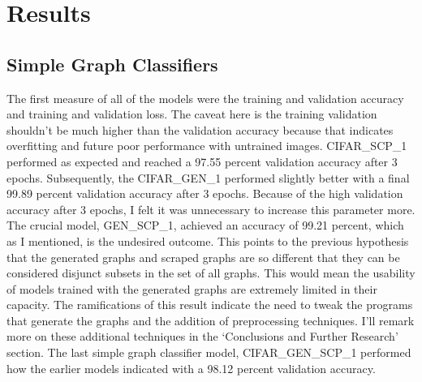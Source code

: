 \documentclass[12pt]{article}
\begin{document}
    \section{Results}
    
        \subsection{Simple Graph Classifiers}

            The first measure of all of the models were the training and validation accuracy and training and validation loss. 
            The caveat here is the training validation shouldn’t be much higher than the validation accuracy 
            because that indicates overfitting and future poor performance with untrained images. 
            CIFAR\_SCP\_1 performed as expected and reached a 97.55 percent validation accuracy after 3 epochs. 
            Subsequently, the CIFAR\_GEN\_1 performed slightly better with a final 99.89 percent validation accuracy after 3 epochs. 
            Because of the high validation accuracy after 3 epochs, I felt it was unnecessary to increase this parameter more. 
            The crucial model, GEN\_SCP\_1, achieved an accuracy of 99.21 percent, 
            which as I mentioned, is the undesired outcome. This points to the previous hypothesis that the generated graphs 
            and scraped graphs are so different that they can be considered disjunct subsets in the set of all graphs. 
            This would mean the usability of models trained with the generated graphs are extremely limited in their capacity. 
            The ramifications of this result indicate the need to tweak the programs 
            that generate the graphs and the addition of preprocessing techniques. 
            I’ll remark more on these additional techniques in the ‘Conclusions and Further Research’ section. 
            The last simple graph classifier model, CIFAR\_GEN\_SCP\_1 performed 
            how the earlier models indicated with a 98.12 percent validation accuracy.
\end{document}
